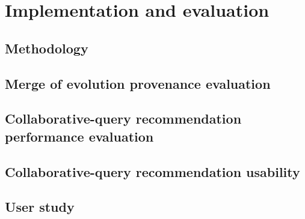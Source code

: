  \section{Implementation and evaluation}
  \label{sec:evaluation-part2}
 	 		  	 
			  \subsection{Methodology}
			   	 
               		       \subsection{Merge of evolution provenance evaluation}
		         	  
		          \subsection{Collaborative-query recommendation performance evaluation}
		          	 
		           \subsection{Collaborative-query recommendation usability}
		          	 
		          \subsection{User study}
		          	   
% 	 		  	 




